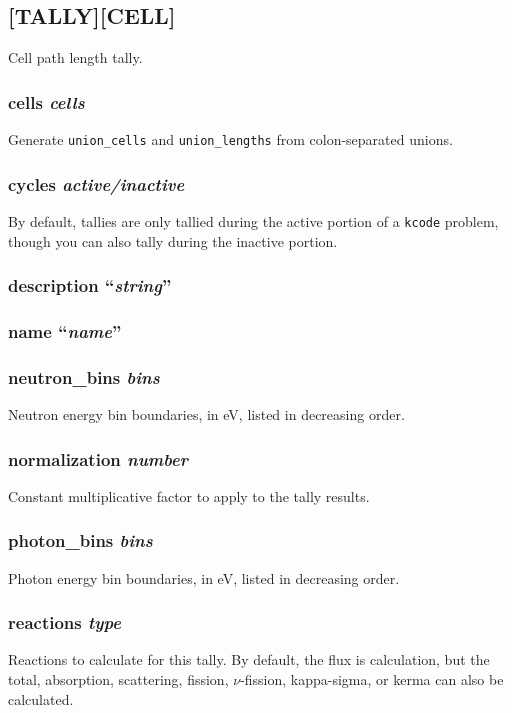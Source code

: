 \documentclass[10pt]{article}
\begin{document}
\subsection{[TALLY][CELL]}
Cell path length tally.

\subsubsection{cells \textit{cells}}
Generate \texttt{union\_cells} and \texttt{union\_lengths} from colon-separated unions. 

\subsubsection{cycles \textit{active/inactive}}
By default, tallies are only tallied during the active portion of a \texttt{kcode} problem, though you can also tally during the inactive portion. 

\subsubsection{description ``\textit{string}''}

\subsubsection{name ``\textit{name}''}

\subsubsection{neutron\_bins \textit{bins}}
Neutron energy bin boundaries, in eV, listed in decreasing order.

\subsubsection{normalization \textit{number}}
Constant multiplicative factor to apply to the tally results. 

\subsubsection{photon\_bins \textit{bins}}
Photon energy bin boundaries, in eV, listed in decreasing order.

\subsubsection{reactions \textit{type}}
Reactions to calculate for this tally. By default, the flux is calculation, but the total, absorption, scattering, fission, \(\nu\)-fission, kappa-sigma, or kerma can also be calculated.
\end{document}
